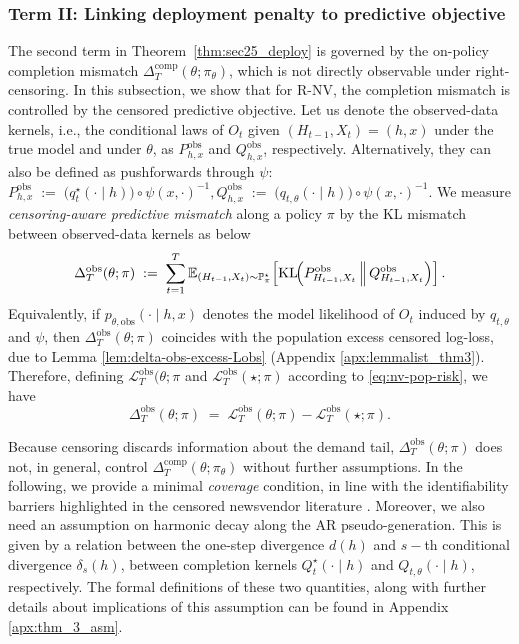 \documentclass[11pt]{article}
\renewcommand{\P}{\mathbb{P}}
\DeclareMathOperator{\KL}{KL}
\providecommand{\cL}{\mathcal{L}}
\begin{document}
\subsubsection{Term II: Linking deployment penalty to predictive objective}
\label{subsubsec:nv-link-deploy-to-obs}
The second term in Theorem~\ref{thm:sec25_deploy} is governed by the on-policy completion mismatch
$\Delta^{\mathrm{comp}}_T(\theta;\pi_\theta)$, which is not directly observable under right-censoring. In this subsection, we show that for R-NV, the completion mismatch is controlled by the censored predictive objective.
Let us denote the observed-data kernels, i.e., the conditional laws of $O_t$ given $(H_{t-1},X_t)=(h,x)$ under the true model and under $\theta$, as $P^{\mathrm{obs}}_{h,x}$ and $Q^{\mathrm{obs}}_{h,x}$, respectively. Alternatively, they can also be defined as pushforwards through $\psi$:
\(
P^{\mathrm{obs}}_{h,x}
\;:=\;
\bigl(q_t^\star(\cdot\mid h)\bigr)\circ \psi(x,\cdot)^{-1},
Q^{\mathrm{obs}}_{h,x}
\;:=\;
\bigl(q_{t,\theta}(\cdot\mid h)\bigr)\circ \psi(x,\cdot)^{-1}
\). We measure \emph{censoring-aware predictive mismatch} along a policy $\pi$ by the KL mismatch between observed-data kernels as below
\begin{equation}
\Delta^{\mathrm{obs}}_T(\theta;\pi)
\;:=\;
\sum_{t=1}^T
\mathbb{E}_{(H_{t-1},X_t)\sim \P^\star_\pi}
\!\left[
\KL\!\Bigl(P^{\mathrm{obs}}_{H_{t-1},X_t}\,\Big\|\,Q^{\mathrm{obs}}_{H_{t-1},X_t}\Bigr)
\right].
\label{eq:def-Delta-obs}
\end{equation}
Equivalently, if $p_{\theta,\mathrm{obs}}(\cdot\mid h,x)$ denotes the model likelihood of $O_t$ induced by $q_{t,\theta}$
and $\psi$, then $\Delta^{\mathrm{obs}}_T(\theta;\pi)$ coincides with the population excess censored log-loss, due to Lemma \ref{lem:delta-obs-excess-Lobs} (Appendix \ref{apx:lemmalist_thm3}). Therefore, defining $\cL^{\mathrm{obs}}_T(\theta;\pi$ and $\cL^{\mathrm{obs}}_T(\star;\pi)$ according to \eqref{eq:nv-pop-risk}, we have
\begin{equation}
\Delta^{\mathrm{obs}}_T(\theta;\pi)
\;=\;
\cL^{\mathrm{obs}}_T(\theta;\pi)-\cL^{\mathrm{obs}}_T(\star;\pi).
\label{eq:Delta-obs-excess-logloss}
\end{equation}

Because censoring discards information about the demand tail, $\Delta^{\mathrm{obs}}_T(\theta;\pi)$ does not, in general,
control $\Delta_T^{\mathrm{comp}}(\theta;\pi_\theta)$ without further assumptions. In the following, we provide a minimal \emph{coverage} condition, in line with the identifiability barriers highlighted in the censored newsvendor literature \citep{hssaine2024censored}. Moreover, we also need an assumption on harmonic decay along the AR pseudo-generation. This is given by a relation between the one-step divergence $d(h)$ and $s-$th conditional divergence $\delta_s(h)$, between completion kernels $Q_t^\star(\cdot\mid h)$ and $Q_{t,\theta}(\cdot\mid h)$, respectively. The formal definitions of these two quantities, along with further details about implications of this assumption can be found in Appendix \ref{apx:thm_3_asm}.
\end{document}
